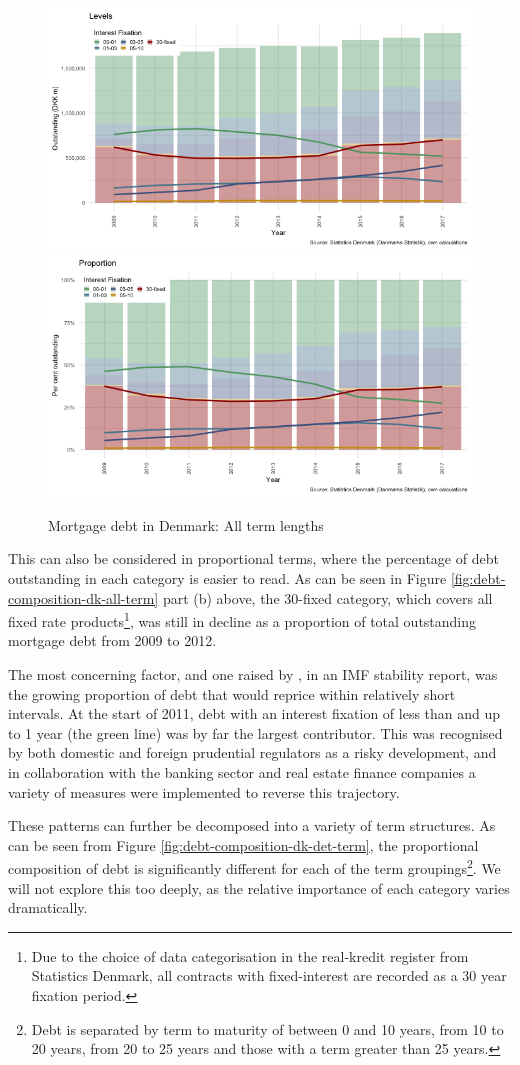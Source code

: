 \documentclass[
]{book}
\begin{document}
\begin{figure}[H]
\includegraphics[width=0.5\linewidth]{figures/unnamed-chunk-8-1} \includegraphics[width=0.5\linewidth]{figures/unnamed-chunk-8-2} \caption{Mortgage debt in Denmark: All term lengths}\label{fig:unnamed-chunk-8}
\end{figure}

This can also be considered in proportional terms, where the percentage of debt outstanding in
each category is easier to read. As can be seen in Figure \ref{fig:debt-composition-dk-all-term} part (b) above,
the 30-fixed category, which covers all fixed rate products\footnote{Due to the choice of data categorisation in the real-kredit register from Statistics Denmark, all contracts with fixed-interest are recorded as a 30 year fixation period.}, was still in decline as a proportion of total outstanding mortgage debt from 2009 to 2012.

The most concerning factor, and one raised by \citet{sheehy2014}, in an IMF stability report, was the growing proportion of debt that would reprice within relatively short intervals. At the start of 2011, debt with an interest fixation of less than and up to 1 year (the green line) was by far the largest contributor. This was recognised by both domestic and foreign prudential regulators as a risky development, and in collaboration with the banking sector and real estate finance companies a variety of measures were implemented to reverse this trajectory. \citep{sheehy2014}

These patterns can further be decomposed into a variety of term structures.
As can be seen from Figure \ref{fig:debt-composition-dk-det-term}, the
proportional composition of debt is significantly different for each of the
term groupings\footnote{Debt is separated by term to maturity of between 0
  and 10 years, from 10 to 20 years, from 20 to 25 years and those with a term
  greater than 25 years.}. We will not explore this too deeply, as the
relative importance of each category varies dramatically.
\end{document}
